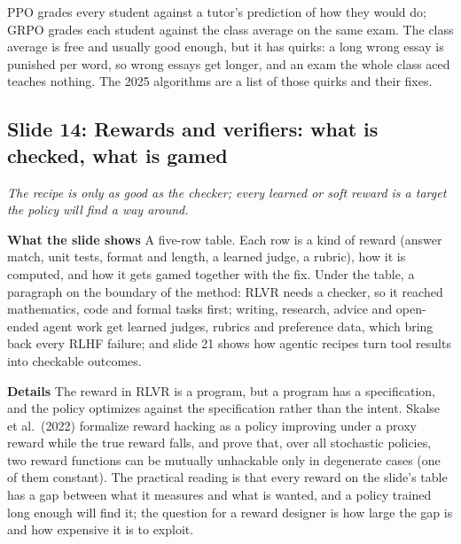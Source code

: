 \documentclass[11pt,letterpaper]{article}
\newcommand{\slide}[3]{%
  \subsection[Slide #1: #2]{Slide #1: #2}%
  {\color{muted}\itshape #3\par}\medskip}
\newcommand{\para}[1]{\medskip\noindent\textbf{#1}\quad}
\newenvironment{intuition}{\begin{tcolorbox}[intuitionbox]}{\end{tcolorbox}}
\begin{document}
\begin{intuition}
PPO grades every student against a tutor's prediction of how they would do; GRPO grades each student against the class average on the same exam. The class average is free and usually good enough, but it has quirks: a long wrong essay is punished per word, so wrong essays get longer, and an exam the whole class aced teaches nothing. The 2025 algorithms are a list of those quirks and their fixes.
\end{intuition}

\slide{14}{Rewards and verifiers: what is checked, what is gamed}{The recipe is only as good as the checker; every learned or soft reward is a target the policy will find a way around.}

\para{What the slide shows} A five-row table. Each row is a kind of reward (answer match, unit tests, format and length, a learned judge, a rubric), how it is computed, and how it gets gamed together with the fix. Under the table, a paragraph on the boundary of the method: RLVR needs a checker, so it reached mathematics, code and formal tasks first; writing, research, advice and open-ended agent work get learned judges, rubrics and preference data, which bring back every RLHF failure; and slide 21 shows how agentic recipes turn tool results into checkable outcomes.

\para{Details} The reward in RLVR is a program, but a program has a specification, and the policy optimizes against the specification rather than the intent. Skalse et al.\ (2022) formalize reward hacking as a policy improving under a proxy reward while the true reward falls, and prove that, over all stochastic policies, two reward functions can be mutually unhackable only in degenerate cases (one of them constant). The practical reading is that every reward on the slide's table has a gap between what it measures and what is wanted, and a policy trained long enough will find it; the question for a reward designer is how large the gap is and how expensive it is to exploit.
\end{document}
